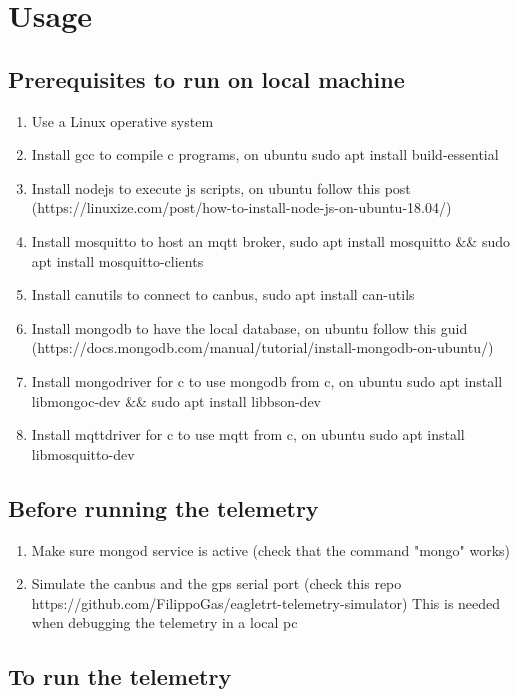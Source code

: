 \section{\huge{Usage}}

\subsection{Prerequisites to run on local machine}

\begin{enumerate}
    \item Use a Linux operative system
    \item Install gcc to compile c programs, on ubuntu sudo apt install build-essential
    \item Install nodejs to execute js scripts, on ubuntu follow this post (https://linuxize.com/post/how-to-install-node-js-on-ubuntu-18.04/)
    \item Install mosquitto to host an mqtt broker, sudo apt install mosquitto \&\& sudo apt install mosquitto-clients
    \item Install canutils to connect to canbus, sudo apt install can-utils
    \item Install mongodb to have the local database, on ubuntu follow this guid (https://docs.mongodb.com/manual/tutorial/install-mongodb-on-ubuntu/)
    \item Install mongodriver for c to use mongodb from c, on ubuntu sudo apt install libmongoc-dev \&\& sudo apt install libbson-dev
    \item Install mqttdriver for c to use mqtt from c, on ubuntu sudo apt install libmosquitto-dev
\end{enumerate}

\subsection{Before running the telemetry}

\begin{enumerate}
    \item Make sure mongod service is active (check that the command "mongo" works)
    \item Simulate the canbus and the gps serial port (check this repo https://github.com/FilippoGas/eagletrt-telemetry-simulator) This is needed when debugging the telemetry in a local pc
\end{enumerate}

\subsection{To run the telemetry}

